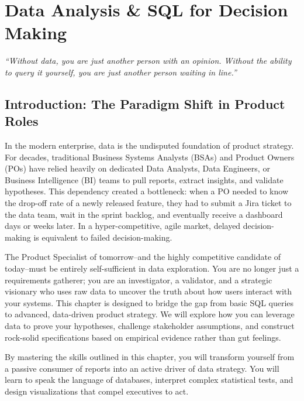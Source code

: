 \documentclass[
  11pt,
  openany,
  oneside]{book}
\renewenvironment{quote}{\begin{customquote}}{\end{customquote}}
\begin{document}
\chapter{Data Analysis \& SQL for Decision
Making}\label{data-analysis-sql-for-decision-making}

\begin{quote}
\emph{``Without data, you are just another person with an opinion.
Without the ability to query it yourself, you are just another person
waiting in line.''}
\end{quote}

\section{Introduction: The Paradigm Shift in Product
Roles}\label{introduction-the-paradigm-shift-in-product-roles}

In the modern enterprise, data is the undisputed foundation of product
strategy. For decades, traditional Business Systems Analysts (BSAs) and
Product Owners (POs) have relied heavily on dedicated Data Analysts,
Data Engineers, or Business Intelligence (BI) teams to pull reports,
extract insights, and validate hypotheses. This dependency created a
bottleneck: when a PO needed to know the drop-off rate of a newly
released feature, they had to submit a Jira ticket to the data team,
wait in the sprint backlog, and eventually receive a dashboard days or
weeks later. In a hyper-competitive, agile market, delayed
decision-making is equivalent to failed decision-making.

The Product Specialist of tomorrow--and the highly competitive candidate
of today--must be entirely self-sufficient in data exploration. You are
no longer just a requirements gatherer; you are an investigator, a
validator, and a strategic visionary who uses raw data to uncover the
truth about how users interact with your systems. This chapter is
designed to bridge the gap from basic SQL queries to advanced,
data-driven product strategy. We will explore how you can leverage data
to prove your hypotheses, challenge stakeholder assumptions, and
construct rock-solid specifications based on empirical evidence rather
than gut feelings.

By mastering the skills outlined in this chapter, you will transform
yourself from a passive consumer of reports into an active driver of
data strategy. You will learn to speak the language of databases,
interpret complex statistical tests, and design visualizations that
compel executives to act.
\end{document}
